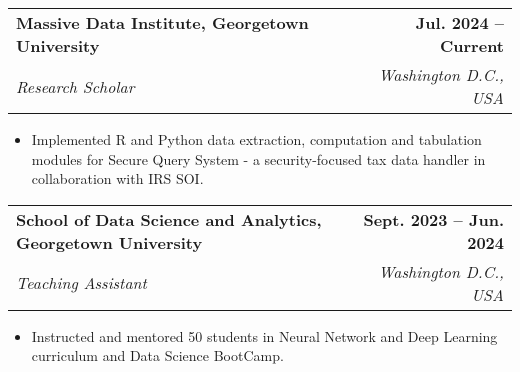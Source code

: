 \documentclass[letterpaper,11pt]{article}
\makeatletter
\newcommand{\resumeItem}[1]{
  \item\small{
    {#1 \vspace{-2pt}}
  }
}
\newcommand{\resumeSubheading}[4]{
  \vspace{-2pt}\item
    \begin{tabular*}{1.0\textwidth}[t]{l@{\extracolsep{\fill}}r}
      \textbf{#1} & \textbf{\small #2} \\
      \textit{\small#3} & \textit{\small #4} \\
    \end{tabular*}\vspace{-7pt}
}
\newcommand{\resumeItemListStart}{\begin{itemize}}
\newcommand{\resumeItemListEnd}{\end{itemize}\vspace{-5pt}}
\makeatother
\begin{document}
    \resumeSubheading
    {Massive Data Institute, Georgetown University}{Jul. 2024 -- Current}
    {Research Scholar}{Washington D.C., USA}
      \resumeItemListStart
        \resumeItem{Implemented R and Python data extraction, computation and tabulation modules for Secure Query System - a security-focused tax data handler in collaboration with IRS SOI.}
      \resumeItemListEnd
    \resumeSubheading
      {School of Data Science and Analytics, Georgetown University}{Sept. 2023 -- Jun. 2024}
      {Teaching Assistant}{Washington D.C., USA}
      \resumeItemListStart
        \resumeItem{Instructed and mentored 50 students in Neural Network and Deep Learning curriculum and Data Science BootCamp.}
    \resumeItemListEnd
\end{document}
